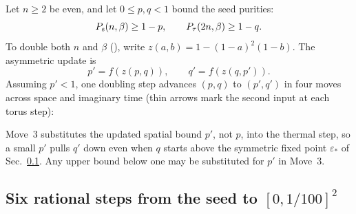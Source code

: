 Let $n\ge2$ be even, and let $0\le p,q<1$ bound the seed purities:
\begin{equation}
    P_{\mathrm s}(n,\beta)\ge1-p,\qquad
    P_{\tau}(2n,\beta)\ge1-q.
    \label{sm:eq:seed-pair}
\end{equation}
To double both $n$ and $\beta$ (\torusseq), write
$z(a,b)=1-(1-a)^2(1-b)$. The asymmetric update is%
~
\begin{equation}
    p'=f(z(p,q)),\qquad q'=f(z(q,p')).
    \label{sm:eq:update}
\end{equation}
Assuming $p'<1$, one doubling step advances $(p,q)$ to $(p',q')$ in four
moves across space and imaginary time (thin arrows mark the second
input at each torus step):
\begin{proofdiagram}
    \asymsteps
\end{proofdiagram}
Move~3 substitutes the updated spatial bound $p'$, not $p$, into the
thermal step, so a small $p'$ pulls $q'$ down even when $q$ starts above
the symmetric fixed point $\varepsilon_*$ of Sec.~\ref{sm:sec:orbit}.
Any upper bound below one may be substituted for $p'$ in Move~3.

\subsection{Six rational steps from the seed to $[0,1/100]^2$}
\label{sm:sec:orbit}

